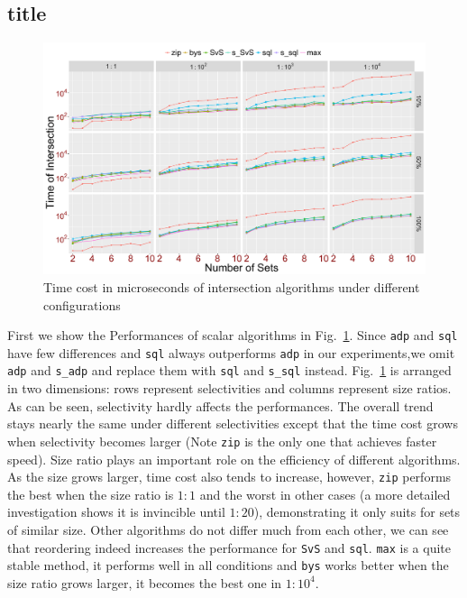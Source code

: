 \documentclass[runningheads,a4paper]{llncs}
\begin{document}
\subsection{title}
\begin{figure}
	\centering
	\includegraphics[width=1.0\linewidth]{scalar}
	\caption{Time cost in microseconds of intersection algorithms under different configurations}
	\label{fig: scalar}
\end{figure}
First we show the Performances of scalar algorithms in Fig.~\ref{fig: scalar}.
Since \texttt{adp} and \texttt{sql} have few differences and \texttt{sql} always outperforms \texttt{adp} in our experiments,we omit \texttt{adp} and \texttt{s\_adp} and replace them with \texttt{sql} and \texttt{s\_sql} instead.
Fig.~\ref{fig: scalar} is arranged in two dimensions: rows represent selectivities and columns represent size ratios.
As can be seen, selectivity hardly affects the performances.
The overall trend stays nearly the same under different selectivities except that the time cost grows when selectivity becomes larger (Note \texttt{zip} is the only one that achieves faster speed).
Size ratio plays an important role on the efficiency of different algorithms.
As the size grows larger, time cost also tends to increase, however, \texttt{zip} performs the best when the size ratio is $ 1:1 $ and the worst in other cases (a more detailed investigation shows it is invincible until $ 1:20 $), demonstrating it only suits for sets of similar size.
Other algorithms do not differ much from each other, we can see that reordering indeed increases the performance for \texttt{SvS} and \texttt{sql}.
\texttt{max} is a quite stable method, it performs well in all conditions and \texttt{bys} works better when the size ratio grows larger, it becomes the best one in $ 1:10^4 $.
\end{document}
